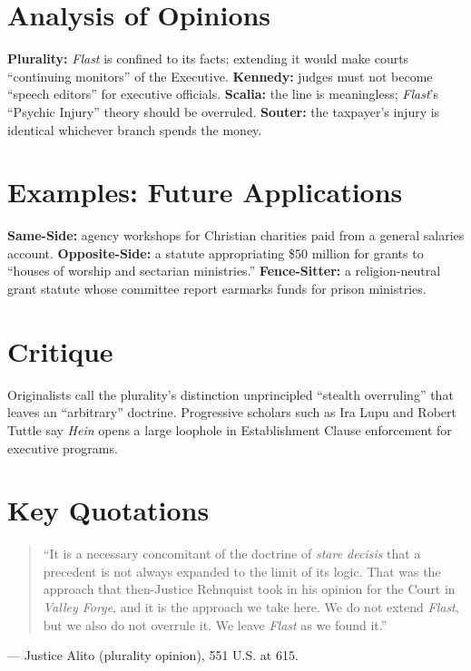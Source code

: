 \documentclass[12pt]{article}
\begin{document}
\section{Analysis of Opinions}
\textbf{Plurality:} \textit{Flast} is confined to its facts; extending it would make courts ``continuing monitors'' of the Executive. \textbf{Kennedy:} judges must not become ``speech editors'' for executive officials. \textbf{Scalia:} the line is meaningless; \textit{Flast}'s ``Psychic Injury'' theory should be overruled. \textbf{Souter:} the taxpayer's injury is identical whichever branch spends the money.

\section{Examples: Future Applications}
\textbf{Same-Side:} agency workshops for Christian charities paid from a general salaries account. \textbf{Opposite-Side:} a statute appropriating \$50 million for grants to ``houses of worship and sectarian ministries.'' \textbf{Fence-Sitter:} a religion-neutral grant statute whose committee report earmarks funds for prison ministries.

\section{Critique}
Originalists call the plurality's distinction unprincipled ``stealth overruling'' that leaves an ``arbitrary'' doctrine. Progressive scholars such as Ira Lupu and Robert Tuttle say \textit{Hein} opens a large loophole in Establishment Clause enforcement for executive programs.

\section{Key Quotations}
\begin{quote}
``It is a necessary concomitant of the doctrine of \textit{stare decisis} that a precedent is not always expanded to the limit of its logic. That was the approach that then-Justice Rehnquist took in his opinion for the Court in \textit{Valley Forge}, and it is the approach we take here. We do not extend \textit{Flast}, but we also do not overrule it. We leave \textit{Flast} as we found it.''
\end{quote}
\noindent --- Justice Alito (plurality opinion), 551 U.S. at 615.
\end{document}
